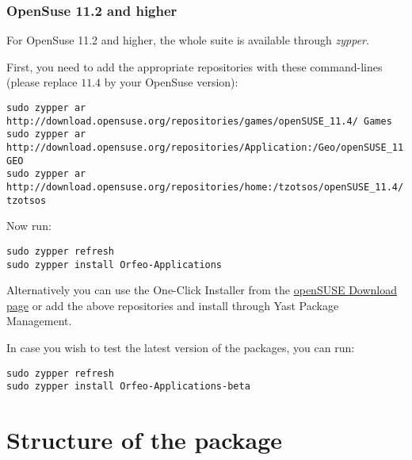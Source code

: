 \subsubsection{OpenSuse 11.2 and higher}
\label{ssec:opensuse_binaries}

For OpenSuse 11.2 and higher, the whole \otb suite is available
through \emph{zypper}.

First, you need to add the appropriate repositories with these
command-lines (please replace $11.4$ by your OpenSuse version):
\begin{verbatim}
sudo zypper ar 
http://download.opensuse.org/repositories/games/openSUSE_11.4/ Games
sudo zypper ar 
http://download.opensuse.org/repositories/Application:/Geo/openSUSE_11.4/ GEO
sudo zypper ar 
http://download.opensuse.org/repositories/home:/tzotsos/openSUSE_11.4/ tzotsos
\end{verbatim}

Now run:
\begin{verbatim}
sudo zypper refresh
sudo zypper install Orfeo-Applications
\end{verbatim}

Alternatively you can use the One-Click Installer from the
\href{http://software.opensuse.org/search?q=Orfeo&baseproject=openSUSE\%3A11.4&lang=en&include_home=true&exclude_debug=true}{openSUSE
  Download page} or add the above repositories and install through
Yast Package Management.

In case you wish to test the latest version of the packages, you can run:
\begin{verbatim}
sudo zypper refresh
sudo zypper install Orfeo-Applications-beta
\end{verbatim}

\section{Structure of the package}\label{sec:appstruct}
